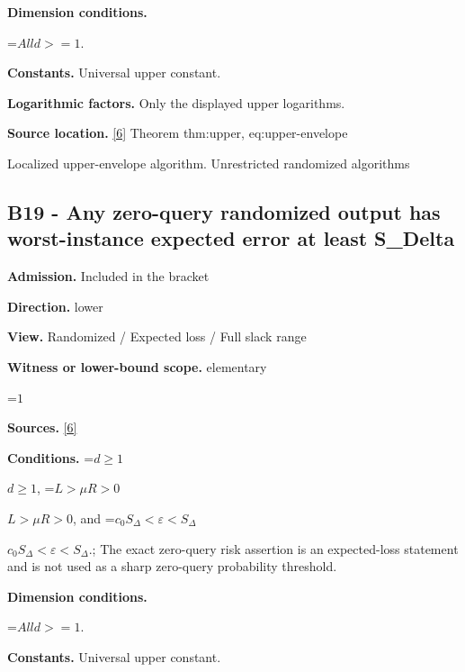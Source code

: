 \documentclass[10pt,a4paper]{article}
\newcommand{\AtlasMath}[1]{\par\begingroup\centering\setbox0=\hbox{$\displaystyle #1$}\ifdim\wd0>1.4\linewidth\typeout{ATLAS WIDE FORMULA: \the\wd0}\fi\ifdim\wd0>\linewidth\resizebox{\linewidth}{!}{\box0}\else\box0\fi\par\endgroup}
\newcommand{\AtlasInlineMath}[1]{\begingroup\setbox0=\hbox{$#1$}\ifdim\wd0>.4\linewidth\endgroup\AtlasMath{#1}\else\endgroup$#1$\fi}
\begin{document}
\textbf{Dimension conditions.}



\AtlasMath{All d>=1.}


\textbf{Constants.} Universal upper constant.



\textbf{Logarithmic factors.} Only the displayed upper logarithms.



\textbf{Source location.} \href{https://github.com/WU-Wendao/Colombo/blob/main/colombo_sensorium/Complexity_altas/data/sources/colombo/U10/manuscript.pdf}{[6]} Theorem thm:upper, eq:upper-envelope



Localized upper-envelope algorithm. Unrestricted randomized algorithms



\subsection{B19 - Any zero-query randomized output has worst-instance expected error at least S\_Delta}


\textbf{Admission.} Included in the bracket



\textbf{Direction.} lower



\textbf{View.} Randomized / Expected loss / Full slack range



\textbf{Witness or lower-bound scope.} elementary



\AtlasMath{1}


\textbf{Sources.} \href{https://github.com/WU-Wendao/Colombo/blob/main/colombo_sensorium/Complexity_altas/data/sources/colombo/U10/manuscript.pdf}{[6]}



\textbf{Conditions.} \AtlasInlineMath{d\ge1}, \AtlasInlineMath{L>\mu R>0}, and \AtlasInlineMath{c_0S_\Delta<\varepsilon<S_\Delta}.; The exact zero-query risk assertion is an expected-loss statement and is not used as a sharp zero-query probability threshold.



\textbf{Dimension conditions.}



\AtlasMath{All d>=1.}


\textbf{Constants.} Universal upper constant.
\end{document}
